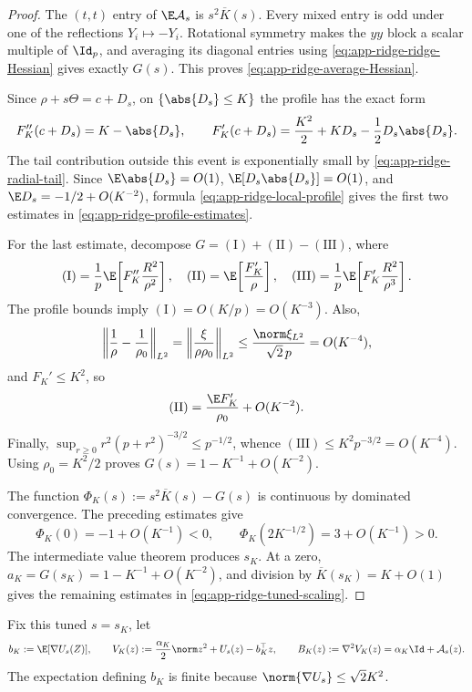\begin{proof}
The \((t,t)\) entry of \(\E\mathcal A_s\) is
\(s^2\overline K(s)\).  Every mixed entry is odd under one of the
reflections \(Y_i\mapsto-Y_i\).  Rotational symmetry makes the \(yy\)
block a scalar multiple of \(\Id_p\), and averaging its diagonal entries
using \eqref{eq:app-ridge-ridge-Hessian} gives exactly \(G(s)\).  This
proves \eqref{eq:app-ridge-average-Hessian}.

Since \(\rho+s\Theta=c+D_s\), on \(\{\abs{D_s}\leq K\}\) the profile has
the exact form
\begin{equation}
  F_K''(c+D_s)=K-\abs{D_s},\qquad
  F_K'(c+D_s)
  =
  \frac{K^2}{2}+KD_s-\frac12D_s\abs{D_s}.
  \label{eq:app-ridge-local-profile}
\end{equation}
The tail contribution outside this event is exponentially small by
\eqref{eq:app-ridge-radial-tail}.  Since
\(\E\abs{D_s}=O(1)\), \(\E[D_s\abs{D_s}]=O(1)\), and
\(\E D_s=-1/2+O(K^{-2})\), formula
\eqref{eq:app-ridge-local-profile} gives the first two estimates in
\eqref{eq:app-ridge-profile-estimates}.

For the last estimate, decompose \(G=(\mathrm I)+(\mathrm{II})
-(\mathrm{III})\), where
\[
  (\mathrm I)=\frac1p\E\!\left[F_K''\frac{R^2}{\rho^2}\right],
  \quad
  (\mathrm{II})=\E\!\left[\frac{F_K'}{\rho}\right],
  \quad
  (\mathrm{III})=\frac1p\E\!\left[F_K'\frac{R^2}{\rho^3}\right].
\]
The profile bounds imply
\((\mathrm I)=O(K/p)=O(K^{-3})\).  Also,
\[
  \left\|\frac1\rho-\frac1{\rho_0}\right\|_{L^2}
  =
  \left\|\frac{\xi}{\rho\rho_0}\right\|_{L^2}
  \leq\frac{\norm\xi_{L^2}}{\sqrt2\,p}
  =O(K^{-4}),
\]
and \(F_K'\leq K^2\), so
\[
  (\mathrm{II})
  =
  \frac{\E F_K'}{\rho_0}+O(K^{-2}).
\]
Finally,
\(\sup_{r\geq0}r^2(p+r^2)^{-3/2}\leq p^{-1/2}\), whence
\((\mathrm{III})\leq K^2p^{-3/2}=O(K^{-4})\).
Using \(\rho_0=K^2/2\) proves
\(G(s)=1-K^{-1}+O(K^{-2})\).

The function
\(\Phi_K(s):=s^2\overline K(s)-G(s)\) is continuous by dominated
convergence.  The preceding estimates give
\[
  \Phi_K(0)=-1+O(K^{-1})<0,\qquad
  \Phi_K(2K^{-1/2})=3+O(K^{-1})>0.
\]
The intermediate value theorem produces \(s_K\).
At a zero, \(a_K=G(s_K)=1-K^{-1}+O(K^{-2})\), and division by
\(\overline K(s_K)=K+O(1)\) gives the remaining estimates in
\eqref{eq:app-ridge-tuned-scaling}.
\end{proof}

Fix this tuned \(s=s_K\), let
\begin{equation}
  b_K:=\E[\nabla U_s(Z)],
  \qquad
  V_K(z):=\frac{\alpha_K}{2}\norm z^2+U_s(z)-b_K^\top z,
  \qquad
  B_K(z):=\nabla^2V_K(z)=\alpha_K\Id+\mathcal A_s(z).
  \label{eq:app-ridge-potential}
\end{equation}
The expectation defining \(b_K\) is finite because
\(\norm{\nabla U_s}\leq\sqrt2K^2\).

